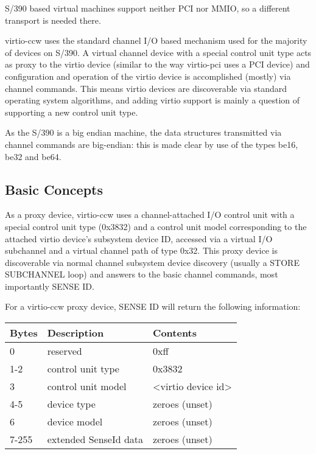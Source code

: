 S/390 based virtual machines support neither PCI nor MMIO, so a
different transport is needed there.

virtio-ccw uses the standard channel I/O based mechanism used for
the majority of devices on S/390. A virtual channel device with a
special control unit type acts as proxy to the virtio device
(similar to the way virtio-pci uses a PCI device) and
configuration and operation of the virtio device is accomplished
(mostly) via channel commands. This means virtio devices are
discoverable via standard operating system algorithms, and adding
virtio support is mainly a question of supporting a new control
unit type.

As the S/390 is a big endian machine, the data structures transmitted
via channel commands are big-endian: this is made clear by use of
the types be16, be32 and be64.

\subsection{Basic Concepts}\label{sec:Virtio Transport Options / Virtio over channel I/O / Basic Concepts}

As a proxy device, virtio-ccw uses a channel-attached I/O control
unit with a special control unit type (0x3832) and a control unit
model corresponding to the attached virtio device's subsystem
device ID, accessed via a virtual I/O subchannel and a virtual
channel path of type 0x32. This proxy device is discoverable via
normal channel subsystem device discovery (usually a STORE
SUBCHANNEL loop) and answers to the basic channel commands, most
importantly SENSE ID.

For a virtio-ccw proxy device, SENSE ID will return the following
information:

\begin{tabular}{ |l|l|l| }
\hline
Bytes & Description & Contents \\
\hline \hline
0     & reserved              & 0xff \\
\hline
1-2   & control unit type     & 0x3832 \\
\hline
3     & control unit model    & <virtio device id> \\
\hline
4-5   & device type           & zeroes (unset) \\
\hline
6     & device model          & zeroes (unset) \\
\hline
7-255 & extended SenseId data & zeroes (unset) \\
\hline
\end{tabular}

